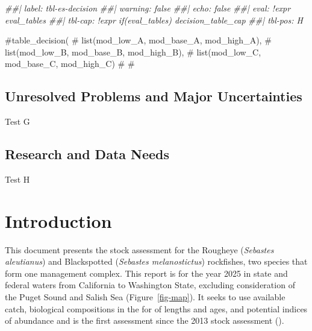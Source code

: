 \documentclass[
]{scrartcl}
\newenvironment{Shaded}{\begin{snugshade}}{\end{snugshade}}
\newcommand{\CommentTok}[1]{\textcolor[rgb]{0.37,0.37,0.37}{#1}}
\newcommand{\DocumentationTok}[1]{\textcolor[rgb]{0.37,0.37,0.37}{\textit{#1}}}
\begin{document}
\endgroup

\begin{Shaded}
\begin{Highlighting}[]
\DocumentationTok{\#\#| label: tbl{-}es{-}decision}
\DocumentationTok{\#\#| warning: false}
\DocumentationTok{\#\#| echo: false}
\DocumentationTok{\#\#| eval: !expr eval\_tables }
\DocumentationTok{\#\#| tbl{-}cap: !expr if(eval\_tables) decision\_table\_cap }
\DocumentationTok{\#\#| tbl{-}pos: H}

\CommentTok{\#table\_decision(}
\CommentTok{\#  list(mod\_low\_A, mod\_base\_A, mod\_high\_A),}
\CommentTok{\#  list(mod\_low\_B, mod\_base\_B, mod\_high\_B),}
\CommentTok{\# list(mod\_low\_C, mod\_base\_C, mod\_high\_C)}
\CommentTok{\#}
\CommentTok{\#}
\end{Highlighting}
\end{Shaded}

\subsection{Unresolved Problems and Major
Uncertainties}\label{unresolved-problems-and-major-uncertainties}

Test G

\subsection{Research and Data Needs}\label{research-and-data-needs}

Test H

\newpage{}

\setlength{\parskip}{5mm plus1mm minus1mm}
\setcounter{page}{1}
\setcounter{section}{0}
\renewcommand{\thefigure}{\arabic{figure}}
\renewcommand{\thetable}{\arabic{table}}

\section{Introduction}\label{introduction}

This document presents the stock assessment for the Rougheye
(\emph{Sebastes aleutianus}) and Blackspotted (\emph{Sebastes
melanostictus}) rockfishes, two species that form one management
complex. This report is for the year 2025 in state and federal waters
from California to Washington State, excluding consideration of the
Puget Sound and Salish Sea (Figure~\ref{fig-map}). It seeks to use
available catch, biological compositions in the for of lengths and ages,
and potential indices of abundance and is the first assessment since the
2013 stock assessment ().
\end{document}
